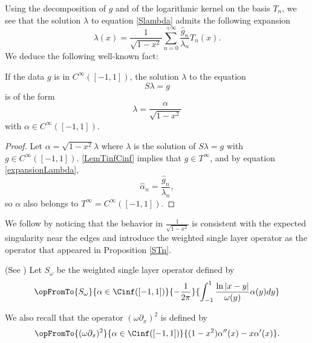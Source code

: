 \documentclass[a4paper]{article}
\begin{document}
	Using the decomposition of $g$ and of the logarithmic kernel on the basis $T_n$, we see that the solution $\lambda$ to equation \eqref{Slambda} admits the following expansion 
	\begin{equation}
		\lambda(x) = \frac{1}{\sqrt{1-x^2}}\sum_{n=0}^{+ \infty} \frac{\hat{g}_n}{\lambda_n} T_n(x).
		\label{expansionLambda}
	\end{equation}
	We deduce the following well-known fact:
	\begin{Cor}
		\label{CorSingularity}
		If the data $g$ is in $C^{\infty}([-1,1])$, the solution $\lambda$ to the equation 
		\[S\lambda = g\]
		is of the form 
		\[\lambda = \dfrac{\alpha}{\sqrt{1-x^2}}\]
		with $\alpha \in C^{\infty}([-1,1])$.  
		\\
		\begin{proof}
			Let $\alpha = \sqrt{1 - x^2}\lambda$ where $\lambda$ is the solution of $S\lambda = g$ with $g \in C^{\infty}([-1,1])$. 
			\autoref{LemTinfCinf} implies that $g \in T^{\infty}$, and by equation \eqref{expansionLambda}, 
			\[ \hat{\alpha}_n = \frac{\hat{g}_n}{\lambda_n},\]
			so $\alpha$ also  belongs to $T^{\infty} = C^{\infty}([-1,1])$. 
		\end{proof}
	\end{Cor}
	
	
	We follow \cite{bruno2012second} by noticing that the behavior in $\frac{1}{\sqrt{1-x^2}}$ is consistent with the expected singularity near the edges and introduce the weighted single layer operator as the operator that appeared in Proposition \ref{STn}.
	\begin{Def}(See \cite{bruno2012second}) 
		Let $S_\omega$ be the weighted single layer operator defined by
		\[\opFromTo{S_\omega}{\alpha \in \Cinf([-1,1])}{-\dfrac{1}{2\pi}}{\int_{-1}^1\dfrac{\ln|x-y|}{\omega(y)} \alpha(y)dy}\]
	\end{Def}
	\noindent We also recall that the operator $(\omega\partial_x)^2$ is defined by \[\opFromTo{(\omega\partial_x)^2}{\alpha \in \Cinf([-1,1])}{(1-x^2)\alpha''(x) - x \alpha'(x)}.\]
	
\end{document}
